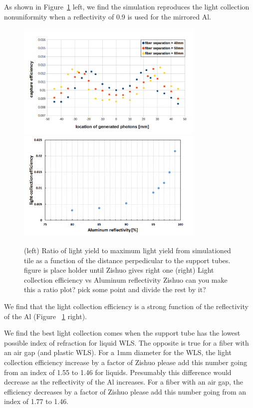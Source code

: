 \documentclass[review]{elsarticle}
\begin{document}
As shown in Figure~\ref{fig:simeff} left, we find the simulation
reproduces the light collection nonuniformity when a reflectivity of
0.9 is used for the mirrored Al.

\begin{figure}[!ht]
\begin{center}
\includegraphics[width=0.8\textwidth]{./figures/geant_result_uniformity.png}
\includegraphics[width=0.8\textwidth]{./figures/geant_result_reflectivity.png}
\caption{(left) Ratio of light yield to maximum light yield from
  simulationed tile as a function of the distance perpedicular to the
  support tubes. {\color{red} figure is place holder until Zishuo
    gives right one} (right) Light collection efficiency vs Aluminum
  reflectivity {\color{red} Zishuo can you make this a ratio plot?
    pick some point and divide the rest by it?} }
\label{fig:simeff}
\end{center}
\end{figure}

We find that the light collection efficiency is a strong function of
the reflectivity of the Al (Figure ~\ref{fig:simeff} right).

We find the best light collection comes when the support tube has the
lowest possible index of refraction for liquid WLS. The opposite is
true for a fiber with an air gap (and plastic WLS). For a 1mm
diameter for the WLS, the light collection efficiency increase by a
factor of {\color{red} Zishuo please add this number} going from an
index of 1.55 to 1.46 for liquids. Presumably this difference would
decrease as the reflectivity of the Al increases. For a fiber with an
air gap, the efficiency decreases by a factor of {\color{red} Zishuo
 please add this number} going from an index of 1.77 to 1.46.
\end{document}
